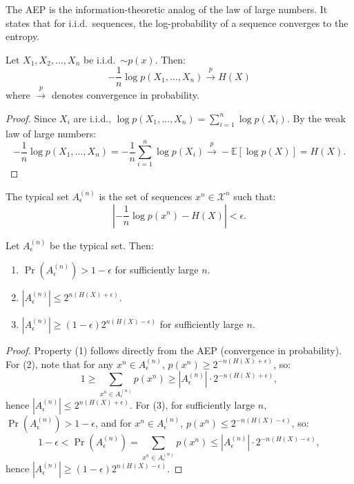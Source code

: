 The AEP is the information-theoretic analog of the law of large numbers. It states that for i.i.d.\ sequences, the log-probability of a sequence converges to the entropy.

\begin{theorem}
Let $X_1,X_2,\dots,X_n$ be i.i.d.\ $\sim p(x)$. Then:
\[
-\frac{1}{n}\log p(X_1,\dots,X_n) \xrightarrow{p} H(X)
\]
where $\xrightarrow{p}$ denotes convergence in probability.
\end{theorem}

\begin{proof}
Since $X_i$ are i.i.d., $\log p(X_1,\dots,X_n) = \sum_{i=1}^n \log p(X_i)$. By the weak law of large numbers:
\[
-\frac{1}{n}\log p(X_1,\dots,X_n) = -\frac{1}{n}\sum_{i=1}^n \log p(X_i) \xrightarrow{p} -\mathbb{E}[\log p(X)] = H(X).
\]
\end{proof}

\begin{definition}
The typical set $A_\epsilon^{(n)}$ is the set of sequences $x^n \in \mathcal{X}^n$ such that:
\[
\left| -\frac{1}{n}\log p(x^n) - H(X) \right| < \epsilon.
\]
\end{definition}

\begin{theorem}
Let $A_\epsilon^{(n)}$ be the typical set. Then:
\begin{enumerate}
\item $\Pr(A_\epsilon^{(n)}) > 1 - \epsilon$ for sufficiently large $n$.
\item $|A_\epsilon^{(n)}| \le 2^{n(H(X)+\epsilon)}$.
\item $|A_\epsilon^{(n)}| \ge (1-\epsilon) 2^{n(H(X)-\epsilon)}$ for sufficiently large $n$.
\end{enumerate}
\end{theorem}

\begin{proof}
Property (1) follows directly from the AEP (convergence in probability). For (2), note that for any $x^n \in A_\epsilon^{(n)}$, $p(x^n) \ge 2^{-n(H(X)+\epsilon)}$, so:
\[
1 \ge \sum_{x^n \in A_\epsilon^{(n)}} p(x^n) \ge |A_\epsilon^{(n)}| \cdot 2^{-n(H(X)+\epsilon)},
\]
hence $|A_\epsilon^{(n)}| \le 2^{n(H(X)+\epsilon)}$. For (3), for sufficiently large $n$, $\Pr(A_\epsilon^{(n)}) > 1-\epsilon$, and for $x^n \in A_\epsilon^{(n)}$, $p(x^n) \le 2^{-n(H(X)-\epsilon)}$, so:
\[
1-\epsilon < \Pr(A_\epsilon^{(n)}) = \sum_{x^n \in A_\epsilon^{(n)}} p(x^n) \le |A_\epsilon^{(n)}| \cdot 2^{-n(H(X)-\epsilon)},
\]
hence $|A_\epsilon^{(n)}| \ge (1-\epsilon) 2^{n(H(X)-\epsilon)}$.
\end{proof}

